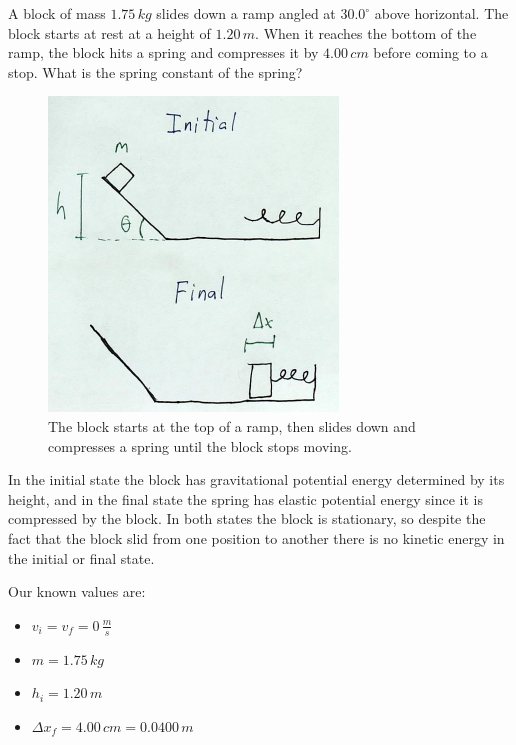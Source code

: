 \documentclass[12pt]{book}
\begin{document}
\begin{exampleblock}

A block of mass $1.75 \, kg$ slides down a ramp angled at $30.0^{\circ}$ above horizontal. The block starts at rest at a height of $1.20 \, m$. When it reaches the bottom of the ramp, the block hits a spring and compresses it by $4.00 \, cm$ before coming to a stop. What is the spring constant of the spring?

\begin{figure}[H]
\centering
\includegraphics[scale=0.8]{spring_ramp_conservation.png}
\caption{The block starts at the top of a ramp, then slides down and compresses a spring until the block stops moving.}
\label{springramp}
\end{figure}

\hspace{10pt}

In the initial state the block has gravitational potential energy determined by its height, and in the final state the spring has elastic potential energy since it is compressed by the block. In both states the block is stationary, so despite the fact that the block slid from one position to another there is no kinetic energy in the initial or final state.

Our known values are:

\begin{itemize}
\item $v_i = v_f = 0 \, \frac{m}{s}$
\item $m = 1.75 \, kg$
\item $h_i = 1.20 \, m$
\item $\Delta x_f = 4.00 \, cm = 0.0400 \, m$
\end{itemize}


\end{exampleblock}
\end{document}
